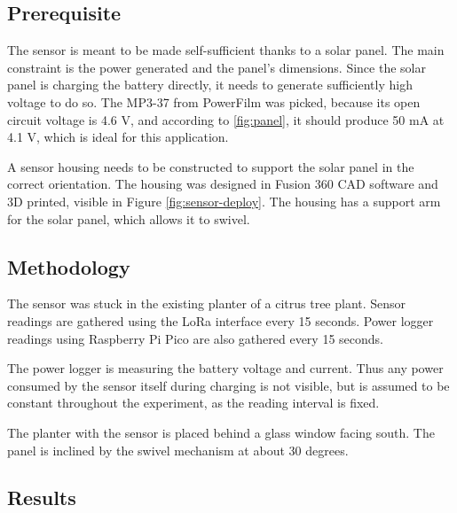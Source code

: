 \subsection{Prerequisite}
The sensor is meant to be made self-sufficient thanks to a solar panel. The main constraint is the power generated and the panel's dimensions. Since the solar panel is charging the battery directly, it needs to generate sufficiently high voltage to do so. The MP3-37 from PowerFilm was picked, because its open circuit voltage is 4.6 V, and according to \ref{fig:panel}, it should produce 50 mA at 4.1 V, which is ideal for this application.


A sensor housing needs to be constructed to support the solar panel in the correct orientation. The housing was designed in Fusion 360 CAD software and 3D printed, visible in Figure \ref{fig:sensor-deploy}. The housing has a support arm for the solar panel, which allows it to swivel.

\subsection{Methodology}
The sensor was stuck in the existing planter of a citrus tree plant. Sensor readings are gathered using the LoRa interface every 15 seconds. Power logger readings using Raspberry Pi Pico are also gathered every 15 seconds. 

The power logger is measuring the battery voltage and current. Thus any power consumed by the sensor itself during charging is not visible, but is assumed to be constant throughout the experiment, as the reading interval is fixed.

The planter with the sensor is placed behind a glass window facing south. The panel is inclined by the swivel mechanism at about 30 degrees.

\subsection{Results}

